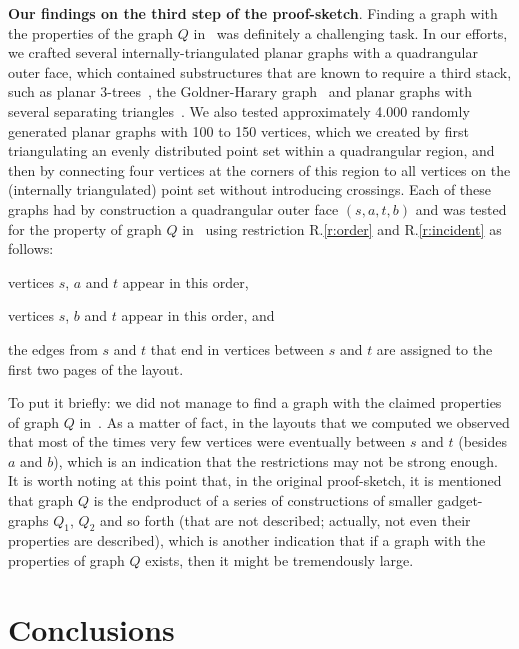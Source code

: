 \documentclass[runningheads]{llncs}
\newcommand{\myparagraph}[1]{\medskip\noindent\textbf{#1}.}
\begin{document}
\myparagraph{Our findings on the third step of the proof-sketch} Finding a graph with the properties of the graph $Q$ in~\cite{DBLP:conf/stoc/Yannakakis86} was definitely a challenging task. In our efforts, we  crafted several internally-triangulated planar graphs with a quadrangular outer face, which contained substructures that are known to require a third stack, such as planar $3$-trees~\cite{DBLP:conf/focs/Heath84}, the Goldner-Harary graph~\cite{GH75} and planar graphs with several separating triangles~\cite{DBLP:journals/appml/KainenO07}. We also tested approximately 4.000 randomly generated planar graphs with 100 to 150 vertices, which we created by first triangulating an evenly distributed point set within a quadrangular region, and then by connecting four vertices at the corners of this region to all vertices on the (internally triangulated) point set without introducing crossings. Each of these graphs had by construction a quadrangular outer face $(s,a,t,b)$ and was tested for the property of graph $Q$ in~\cite{DBLP:conf/stoc/Yannakakis86} using restriction R.\ref{r:order} and R.\ref{r:incident} as follows: 
%
\begin{inparaenum}[(i)]
\item vertices $s$, $a$ and $t$ appear in this order, 
\item vertices $s$, $b$ and $t$ appear in this order, and
\item the edges from $s$ and $t$ that end in vertices between $s$ and $t$ are assigned to the first two pages of the layout.
\end{inparaenum} 

To put it briefly: we did not manage to find a graph with the claimed properties of graph $Q$ in~\cite{DBLP:conf/stoc/Yannakakis86}. As a matter of fact, in the layouts that we computed we observed that most of the times very few vertices were eventually between $s$ and $t$ (besides $a$ and $b$), which is an indication that the restrictions may not be strong enough. It is worth noting at this point that, in the original proof-sketch, it is mentioned that graph $Q$ is the endproduct of a series of constructions of smaller gadget-graphs $Q_1$, $Q_2$ and so forth (that are not described; actually, not even their properties are described), which is another indication that if a graph with the properties of graph $Q$ exists, then it might be tremendously large.
 

\section{Conclusions}
\label{sec:conclusions}
\end{document}

